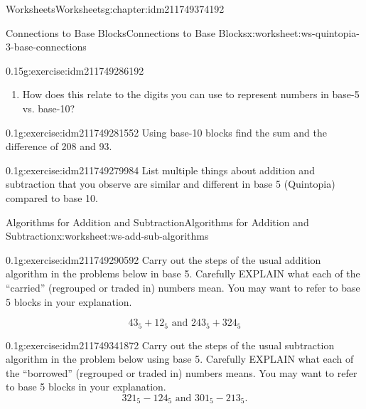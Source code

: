 \documentclass[twoside,11pt,]{book}
\begin{document}
\begin{chapterptx}{Worksheets}{}{Worksheets}{}{}{g:chapter:idm211749374192}
\begin{worksheet-section-numberless}{Connections to Base Blocks}{}{Connections to Base Blocks}{}{}{x:worksheet:ws-quintopia-3-base-connections}
\begin{divisionexercise}{3}{}{0.15}{g:exercise:idm211749286192}
\begin{enumerate}[label=(\alph*)]
\item{}How does this relate to the digits you can use to represent numbers in base-5 vs. base-10?%
\end{enumerate}
\end{divisionexercise}%
\begin{divisionexercise}{4}{}{0.1}{g:exercise:idm211749281552}%
Using base-10 blocks find the sum and the difference of 208 and 93.%
\end{divisionexercise}%
\begin{divisionexercise}{5}{}{0.1}{g:exercise:idm211749279984}%
List multiple things about addition and subtraction that you observe are similar and different in base 5 (Quintopia) compared to base 10.%
\end{divisionexercise}%
\end{worksheet-section-numberless}
\restoregeometry
%
%
\typeout{************************************************}
\typeout{************************************************}
%
\begin{worksheet-section-numberless}{Algorithms for Addition and Subtraction}{}{Algorithms for Addition and Subtraction}{}{}{x:worksheet:ws-add-sub-algorithms}
\begin{divisionexercise}{1}{}{0.1}{g:exercise:idm211749290592}%
Carry out the steps of the usual addition algorithm in the problems below in base 5.  Carefully EXPLAIN what each of the ``carried'' (regrouped or traded in) numbers mean.  You may want to refer to base 5 blocks in your explanation.%
\par
%
\begin{equation*}
43_{5}+12_{5} \text{ and } 243_{5}+324_{5}
\end{equation*}
%
\end{divisionexercise}%
\clearpage
\begin{divisionexercise}{2}{}{0.1}{g:exercise:idm211749341872}%
Carry out the steps of the usual subtraction algorithm in the problem below using base 5.  Carefully EXPLAIN what each of the ``borrowed'' (regrouped or traded in) numbers means.  You may want to refer to base 5 blocks in your explanation.%
\begin{equation*}
321_{5}-124_5 \text{ and } 301_5-213_5 \text{.}
\end{equation*}
%
\end{divisionexercise}%
\end{worksheet-section-numberless}

\end{chapterptx}
\end{document}
